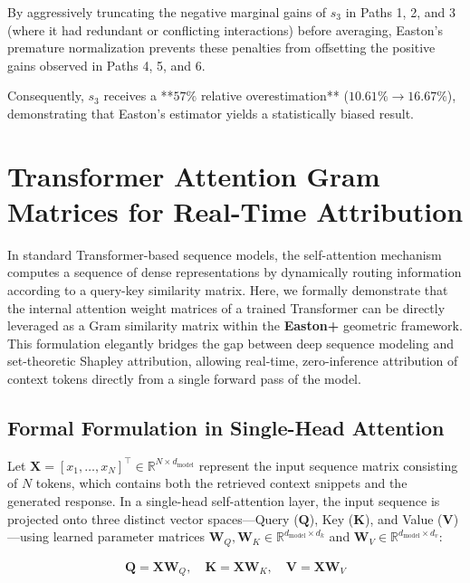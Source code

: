 \documentclass{article}
\begin{document}
By aggressively truncating the negative marginal gains of $s_3$ in Paths 1, 2, and 3 (where it had redundant or conflicting interactions) before averaging, Easton's premature normalization prevents these penalties from offsetting the positive gains observed in Paths 4, 5, and 6. 

Consequently, $s_3$ receives a **$57\%$ relative overestimation** ($10.61\% \to 16.67\%$), demonstrating that Easton's estimator yields a statistically biased result.



\section{Transformer Attention Gram Matrices for Real-Time Attribution}

In standard Transformer-based sequence models, the self-attention mechanism computes a sequence of dense representations by dynamically routing information according to a query-key similarity matrix. Here, we formally demonstrate that the internal attention weight matrices of a trained Transformer can be directly leveraged as a Gram similarity matrix within the \textbf{Easton+} geometric framework. This formulation elegantly bridges the gap between deep sequence modeling and set-theoretic Shapley attribution, allowing real-time, zero-inference attribution of context tokens directly from a single forward pass of the model.

\subsection{Formal Formulation in Single-Head Attention}

Let $\mathbf{X} = [x_1, \dots, x_N]^\top \in \mathbb{R}^{N \times d_{\text{model}}}$ represent the input sequence matrix consisting of $N$ tokens, which contains both the retrieved context snippets and the generated response. In a single-head self-attention layer, the input sequence is projected onto three distinct vector spaces—Query ($\mathbf{Q}$), Key ($\mathbf{K}$), and Value ($\mathbf{V}$)—using learned parameter matrices $\mathbf{W}_Q, \mathbf{W}_K \in \mathbb{R}^{d_{\text{model}} \times d_k}$ and $\mathbf{W}_V \in \mathbb{R}^{d_{\text{model}} \times d_v}$:

\begin{align}
    \mathbf{Q} = \mathbf{X}\mathbf{W}_Q, \quad \mathbf{K} = \mathbf{X}\mathbf{W}_K, \quad \mathbf{V} = \mathbf{X}\mathbf{W}_V
\end{align}
\end{document}
